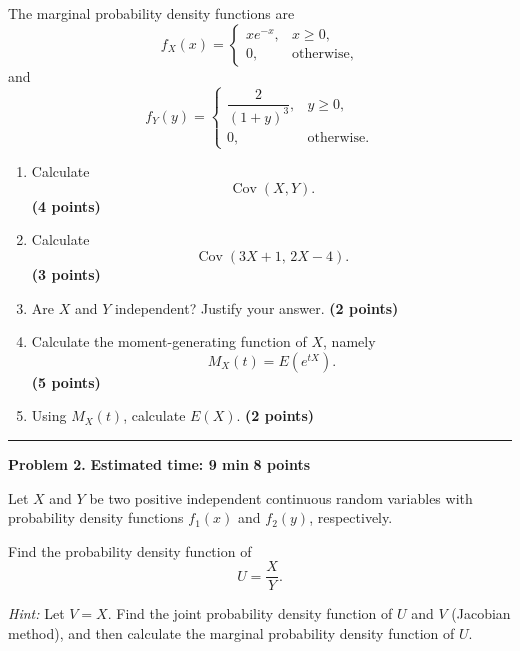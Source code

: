 \documentclass[11pt]{article}
\begin{document}
The marginal probability density functions are
\[
f_X(x)
=
\begin{cases}
xe^{-x}, & x\geq0,\\
0, & \text{otherwise},
\end{cases}
\]
and
\[
f_Y(y)
=
\begin{cases}
\dfrac{2}{(1+y)^3}, & y\geq0,\\
0, & \text{otherwise}.
\end{cases}
\]

\begin{enumerate}[label=(\alph*),leftmargin=*,itemsep=0.8em]

    \item Calculate
    \[
    \operatorname{Cov}(X,Y).
    \]
    \hfill \textbf{(4 points)}

    \item Calculate
    \[
    \operatorname{Cov}(3X+1,\,2X-4).
    \]
    \hfill \textbf{(3 points)}

    \item Are \(X\) and \(Y\) independent? Justify your answer.
    \hfill \textbf{(2 points)}

    \item Calculate the moment-generating function of \(X\), namely
    \[
    M_X(t)=E(e^{tX}).
    \]
    \hfill \textbf{(5 points)}

    \item Using \(M_X(t)\), calculate \(E(X)\).
    \hfill \textbf{(2 points)}

\end{enumerate}

\hrule



\newpage

\begin{problemheader}
\textbf{Problem 2.}
\hfill
\textbf{Estimated time: 9 min}
\qquad
\textbf{8 points}
\end{problemheader}

Let \(X\) and \(Y\) be two positive independent continuous random variables
with probability density functions \(f_1(x)\) and \(f_2(y)\), respectively.

Find the probability density function of
\[
U=\frac{X}{Y}.
\]

\textit{Hint:} Let \(V=X\). Find the joint probability density function of
\(U\) and \(V\) (Jacobian method), and then calculate the marginal probability
density function of \(U\).
\end{document}
